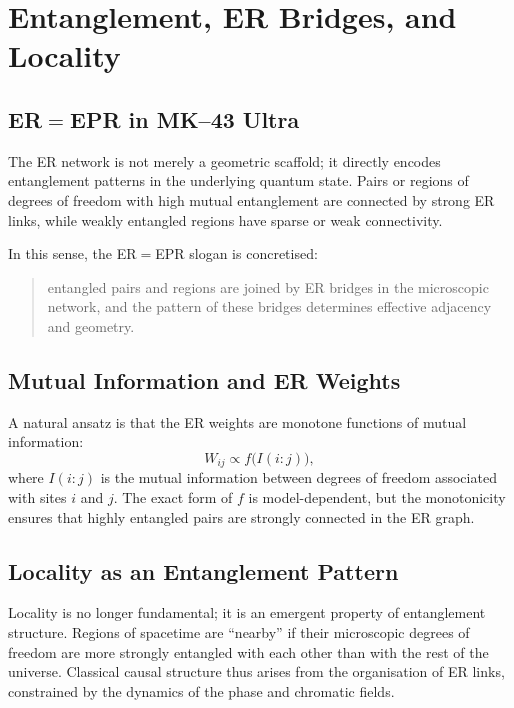 \chapter{Entanglement, ER Bridges, and Locality}

\section{ER$=$EPR in MK--43 Ultra}

The ER network is not merely a geometric scaffold; it directly encodes entanglement patterns in the underlying quantum state.
Pairs or regions of degrees of freedom with high mutual entanglement are connected by strong ER links, while weakly entangled regions have sparse or weak connectivity.

In this sense, the ER$=$EPR slogan is concretised:
\begin{quote}
  entangled pairs and regions are joined by ER bridges in the microscopic network, and the pattern of these bridges determines effective adjacency and geometry.
\end{quote}

\section{Mutual Information and ER Weights}

A natural ansatz is that the ER weights are monotone functions of mutual information:
\[
  W_{ij} \propto f\big(I(i:j)\big),
\]
where $I(i:j)$ is the mutual information between degrees of freedom associated with sites $i$ and $j$.
The exact form of $f$ is model-dependent, but the monotonicity ensures that highly entangled pairs are strongly connected in the ER graph.

\section{Locality as an Entanglement Pattern}

Locality is no longer fundamental; it is an emergent property of entanglement structure.
Regions of spacetime are ``nearby'' if their microscopic degrees of freedom are more strongly entangled with each other than with the rest of the universe.
Classical causal structure thus arises from the organisation of ER links, constrained by the dynamics of the phase and chromatic fields.

